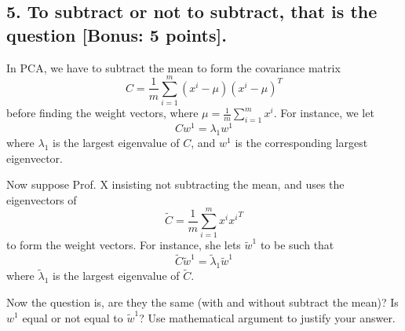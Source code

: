 \documentclass[twoside,10pt]{article}
\begin{document}
\clearpage


\subsection*{5. To subtract or not to subtract, that is the question [Bonus: 5 points].}

In PCA, we have to subtract the mean to form the covariance matrix 
\[
C = \frac 1 m \sum_{i=1}^m (x^i - \mu)(x^i - \mu)^T 
\]
before finding the weight vectors, where $\mu = \frac 1m \sum_{i=1}^m x^i$. For instance, we let
\[
 C w^1= \lambda_1 w^1
\]
where $\lambda_1$ is the largest eigenvalue of $C$, and $w^1$ is the corresponding largest eigenvector.  

Now suppose Prof. X insisting not subtracting the mean, and uses the eigenvectors of 
\[
\tilde C = \frac 1 m \sum_{i=1}^m x^i {x^i}^T
\]
to form the weight vectors. For instance, she lets $\tilde w^1$ to be such that 
\[
\tilde C \tilde w^1 = \tilde \lambda_1 \tilde w^1
\]
where $\tilde \lambda_1$ is the largest eigenvalue of $\tilde C$. 

Now the question is, are they the same (with and without subtract the mean)? Is $w^1$ equal or not equal to $\tilde w^1$? Use mathematical argument to justify your answer.
\end{document}
